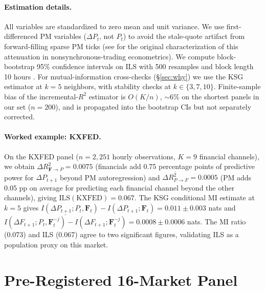 \documentclass{article}
\begin{document}
\paragraph{Estimation details.}
All variables are standardized to zero mean and unit variance. We use first-differenced PM variables ($\Delta P_t$, not $P_t$) to avoid the stale-quote artifact from forward-filling sparse PM ticks (see \citealt{lomackinlay1990econometric} for the original characterization of this attenuation in nonsynchronous-trading econometrics). We compute block-bootstrap 95\% confidence intervals on $\mathrm{ILS}$ with 500 resamples and block length 10 hours \citep{kunsch1989jackknife}. For mutual-information cross-checks (\S\ref{sec:why}) we use the KSG estimator at $k = 5$ neighbors, with stability checks at $k \in \{3, 7, 10\}$. Finite-sample bias of the incremental-$R^2$ estimator is $O(K/n)$, $\sim 6\%$ on the shortest panels in our set ($n = 200$), and is propagated into the bootstrap CIs but not separately corrected.

\paragraph{Worked example: KXFED.}
On the KXFED panel ($n = 2{,}251$ hourly observations, $K = 9$ financial channels), we obtain $\Delta R^2_{\mathbf{F} \to P} = 0.0075$ (financials add 0.75 percentage points of predictive power for $\Delta P_{t+1}$ beyond PM autoregression) and $\overline{\Delta R^2_{P \to F}} = 0.0005$ (PM adds 0.05 pp on average for predicting each financial channel beyond the other channels), giving $\mathrm{ILS}(\text{KXFED}) = 0.067$. The KSG conditional MI estimate at $k = 5$ gives $I(\Delta P_{t+1}; P_t, \mathbf{F}_t) - I(\Delta P_{t+1}; \mathbf{F}_t) = 0.011 \pm 0.003$ nats and $\overline{I(\Delta F_{t+1}; P_t, \mathbf{F}_t^{-j}) - I(\Delta F_{t+1}; \mathbf{F}_t^{-j})} = 0.0008 \pm 0.0006$ nats. The MI ratio (0.073) and ILS (0.067) agree to two significant figures, validating ILS as a population proxy on this market.

\section{Pre-Registered 16-Market Panel}
\label{sec:panel}
\end{document}
